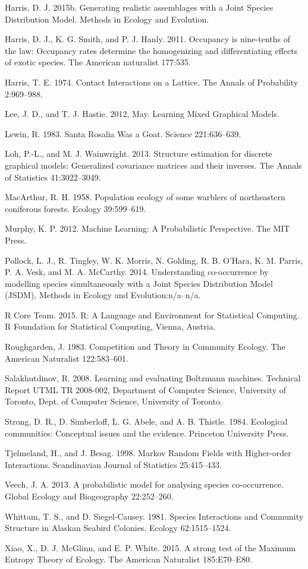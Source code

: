 \documentclass[12pt,]{article}
\begin{document}
\begin{spacing}{1.9}
\begin{flushleft}
Harris, D. J. 2015b. Generating realistic assemblages with a Joint
Species Distribution Model. Methods in Ecology and Evolution.

Harris, D. J., K. G. Smith, and P. J. Hanly. 2011. Occupancy is
nine-tenths of the law: Occupancy rates determine the homogenizing and
differentiating effects of exotic species. The American naturalist
177:535.

Harris, T. E. 1974. Contact Interactions on a Lattice. The Annals of
Probability 2:969--988.

Lee, J. D., and T. J. Hastie. 2012, May. Learning Mixed Graphical
Models.

Lewin, R. 1983. Santa Rosalia Was a Goat. Science 221:636--639.

Loh, P.-L., and M. J. Wainwright. 2013. Structure estimation for
discrete graphical models: Generalized covariance matrices and their
inverses. The Annals of Statistics 41:3022--3049.

MacArthur, R. H. 1958. Population ecology of some warblers of
northeastern coniferous forests. Ecology 39:599--619.

Murphy, K. P. 2012. Machine Learning: A Probabilistic Perspective. The
MIT Press.

Pollock, L. J., R. Tingley, W. K. Morris, N. Golding, R. B. O'Hara, K.
M. Parris, P. A. Vesk, and M. A. McCarthy. 2014. Understanding
co-occurrence by modelling species simultaneously with a Joint Species
Distribution Model (JSDM). Methods in Ecology and Evolution:n/a--n/a.

R Core Team. 2015. R: A Language and Environment for Statistical
Computing. R Foundation for Statistical Computing, Vienna, Austria.

Roughgarden, J. 1983. Competition and Theory in Community Ecology. The
American Naturalist 122:583--601.

Salakhutdinov, R. 2008. Learning and evaluating Boltzmann machines.
Technical Report UTML TR 2008-002, Department of Computer Science,
University of Toronto, Dept. of Computer Science, University of Toronto.

Strong, D. R., D. Simberloff, L. G. Abele, and A. B. Thistle. 1984.
Ecological communities: Conceptual issues and the evidence. Princeton
University Press.

Tjelmeland, H., and J. Besag. 1998. Markov Random Fields with
Higher-order Interactions. Scandinavian Journal of Statistics
25:415--433.

Veech, J. A. 2013. A probabilistic model for analysing species
co-occurrence. Global Ecology and Biogeography 22:252--260.

Whittam, T. S., and D. Siegel-Causey. 1981. Species Interactions and
Community Structure in Alaskan Seabird Colonies. Ecology 62:1515--1524.

Xiao, X., D. J. McGlinn, and E. P. White. 2015. A strong test of the
Maximum Entropy Theory of Ecology. The American Naturalist 185:E70--E80.
\end{flushleft}
\end{spacing}
\end{document}
